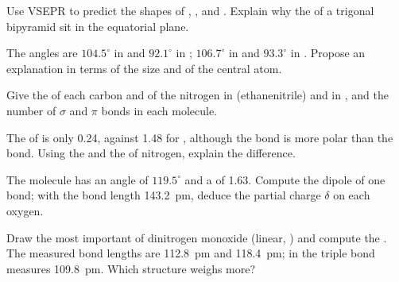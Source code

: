 \begin{exercise}[$\star\star$]\label{exo:b1:lewis-resonance-vsepr:7}
Use VSEPR to predict the shapes of , ,  and
. Explain why the  of a trigonal bipyramid sit in the
equatorial plane.
\end{exercise}

\begin{exercise}[$\star\star$]\label{exo:b1:lewis-resonance-vsepr:8}
The angles  are $104.5^\circ$ in  and $92.1^\circ$ in
; $106.7^\circ$ in  and $93.3^\circ$ in . Propose
an explanation in terms of the size and  of the central
atom.
\end{exercise}

\begin{exercise}[$\star\star$]\label{exo:b1:lewis-resonance-vsepr:9}
Give the  of each carbon and of the nitrogen in
 (ethanenitrile) and in , and the number of
$\sigma$ and $\pi$ bonds in each molecule.
\end{exercise}

\begin{exercise}[$\star\star\star$]\label{exo:b1:lewis-resonance-vsepr:10}
The  of  is only \qty{0.24}{\debye}, against
\qty{1.48}{\debye} for , although the  bond is more polar
than the  bond. Using the  and the  of
nitrogen, explain the difference.
\end{exercise}

\begin{exercise}[$\star\star\star$]\label{exo:b1:lewis-resonance-vsepr:11}
The  molecule has an angle of $119.5^\circ$ and a 
of \qty{1.63}{\debye}. Compute the dipole of one  bond; with the
bond length \qty{143.2}{pm}, deduce the partial charge $\delta$ on each
oxygen.
\end{exercise}

\begin{exercise}[$\star\star\star$]\label{exo:b1:lewis-resonance-vsepr:12}
Draw the most important  of dinitrogen monoxide 
(linear, ) and compute the . The measured bond
lengths are  \qty{112.8}{pm} and  \qty{118.4}{pm}; in
 the triple bond measures \qty{109.8}{pm}. Which structure weighs
more?
\end{exercise}

